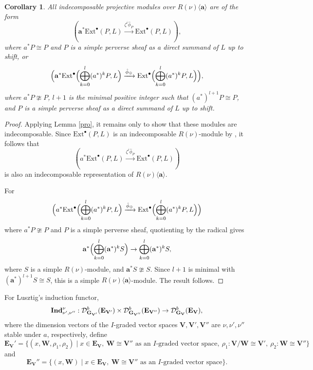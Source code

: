 \documentclass[10pt,a4paper]{amsart}
\newtheorem{corollary}[theorem]{Corollary}
\def\bfV{{\mathbf V}}
\def\bfV{\mathbf{V}}
\def\bfW{\mathbf{W}}
\def\bfE{\mathbf{E}}
\def\bfG{\mathbf{G}}
\def\Ind{\mathbf{Ind}}
\begin{document}
\begin{corollary}\label{apro}
All indecomposable projective modules over $R(\nu)\langle\mathbf{a}\rangle$ are of the form
\[
(\mathbf{a}^* \mathrm{Ext}^{\bullet}(P, L) \xrightarrow{\zeta^i \hat{\phi}_P} \mathrm{Ext}^{\bullet}(P, L)),
\]
where $a^* P \cong P$ and $P$ is a simple perverse sheaf as a direct summand of $L$ up to shift, or
\[
\Bigl( \mathbf{a}^* \mathrm{Ext}^{\bullet}\Bigl( \bigoplus_{k=0}^{l} (a^*)^k P, L \Bigr) 
\xrightarrow{\hat{\phi}_{\oplus}} 
\mathrm{Ext}^{\bullet}\Bigl( \bigoplus_{k=0}^{l} (a^*)^k P, L \Bigr) \Bigr),
\]
where $a^* P \ncong P$, $l+1$ is the minimal positive integer such that $(a^*)^{l+1} P \cong P$, and $P$ is a simple perverse sheaf as a direct summand of $L$ up to shift.
\end{corollary}

\begin{proof}
Applying Lemma \ref{pro}, it remains only to show that these modules are indecomposable. Since $\mathrm{Ext}^{\bullet}(P, L)$ is an indecomposable $R(\nu)$-module by \cite[Theorem 4.4]{VaragnoloVasserot+2011+67+100}, it follows that
\[
(a^* \mathrm{Ext}^{\bullet}(P, L) \xrightarrow{\zeta^i \hat{\phi}_P} \mathrm{Ext}^{\bullet}(P, L))
\]
is also an indecomposable representation of $R(\nu)\langle\mathbf{a}\rangle$.

For
\[
\Bigl( a^* \mathrm{Ext}^{\bullet}\Bigl( \bigoplus_{k=0}^{l} (a^*)^k P, L \Bigr) 
\xrightarrow{\hat{\phi}_{\oplus}} 
\mathrm{Ext}^{\bullet}\Bigl( \bigoplus_{k=0}^{l} (a^*)^k P, L \Bigr) \Bigr)
\]
where $a^* P \ncong P$ and $P$ is a simple perverse sheaf, quotienting by the radical gives
\[
\mathbf{a}^* \Bigl( \bigoplus_{k=0}^{l} (\mathbf{a}^*)^k S \Bigr) \to \bigoplus_{k=0}^{l} (\mathbf{a}^*)^k S,
\]
where $S$ is a simple $R(\nu)$-module, and $\mathbf{a}^* S \ncong S$. Since $l+1$ is minimal with $(\mathbf{a}^*)^{l+1} S \cong S$, this is a simple $R(\nu)\langle\mathbf{a}\rangle$-module. The result follows.
\end{proof}
For Lusztig's induction functor,
\[
\Ind_{\nu',\nu''}^{\nu}:
\cD_{\bfG_{\bfV'}}^b(\bfE_{\bfV'})\times
\cD_{\bfG_{\bfV''}}^b(\bfE_{\bfV''})
\rightarrow \cD_{\bfG_{\bfV}}^b(\bfE_{\bfV}),
\]
where the dimension vectors of the $I$-graded vector spaces $\bfV, \bfV', \bfV''$ are $\nu, \nu', \nu''$ stable under $a$, respectively, define
\[
\bfE_{\bfV}'=\{(x,\bfW,\rho_1,\rho_2)\mid x\in \bfE_{\bfV},\ \bfW\cong \bfV''\text{ as an }I\text{-graded vector space},\
\rho_1:\bfV/\bfW\cong \bfV',\ \rho_2:\bfW\cong \bfV''\}
\]
and
\[
\bfE_{\bfV}''=\{(x,\bfW)\mid x\in \bfE_{\bfV},\ \bfW\cong \bfV''\text{ as an }I\text{-graded vector space}\}.
\]
\end{document}

